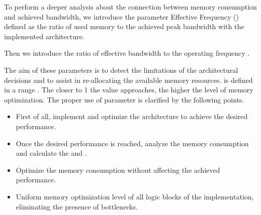 To perform a deeper analysis about the connection between memory
consumption and achieved bandwidth, we introduce the parameter
Effective Frequency () defined as the ratio of used memory to
the achieved peak bandwidth with the implemented architecture.





Then we introduce the ratio  of effective bandwidth to the
operating frequency .




The aim of these parameters is to detect the limitations of the
architectural decisions and to assist in re-allocating the available
memory resources.
 is defined in a range .
The closer to 1 the value approaches, the higher the level of memory
optimization.
The proper use of parameter  is clarified by the following points.

\begin{itemize}
\item First of all, implement and optimize the architecture to achieve
the desired performance.
\item Once the desired performance is reached, analyze the memory
consumption and calculate the  and .
\item Optimize the memory consumption without affecting the achieved
performance.
\item Uniform memory optimization level of all logic blocks of the
implementation, eliminating the presence of bottlenecks.
\end{itemize}


